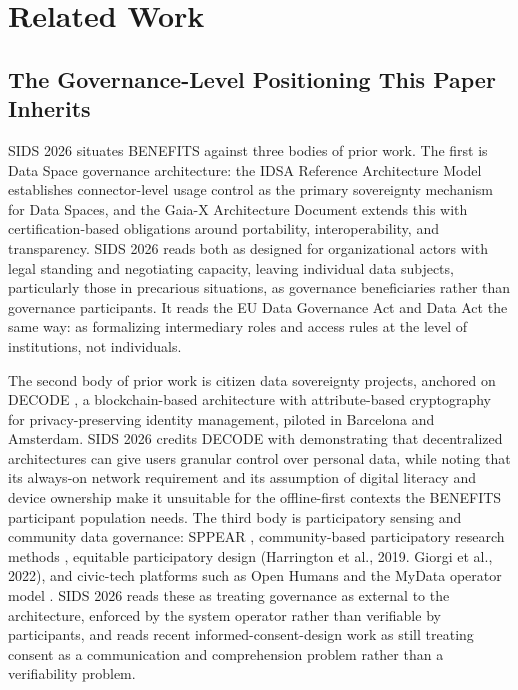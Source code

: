 \section{Related Work}

\subsection{The Governance-Level Positioning This Paper Inherits}

SIDS 2026 \cite{katrakazas2026} situates BENEFITS against three bodies of prior work. The first is Data Space governance architecture: the IDSA Reference Architecture Model \cite{idsram4} establishes connector-level usage control as the primary sovereignty mechanism for Data Spaces, and the Gaia-X Architecture Document \cite{gaiax} extends this with certification-based obligations around portability, interoperability, and transparency. SIDS 2026 \cite{katrakazas2026} reads both as designed for organizational actors with legal standing and negotiating capacity, leaving individual data subjects, particularly those in precarious situations, as governance beneficiaries rather than governance participants. It reads the EU Data Governance Act and Data Act the same way: as formalizing intermediary roles and access rules at the level of institutions, not individuals.

The second body of prior work is citizen data sovereignty projects, anchored on DECODE \cite{decode2019}, a blockchain-based architecture with attribute-based cryptography for privacy-preserving identity management, piloted in Barcelona and Amsterdam. SIDS 2026 \cite{katrakazas2026} credits DECODE with demonstrating that decentralized architectures can give users granular control over personal data, while noting that its always-on network requirement and its assumption of digital literacy and device ownership make it unsuitable for the offline-first contexts the BENEFITS participant population needs. The third body is participatory sensing and community data governance: SPPEAR \cite{gisdakis2014}, community-based participatory research methods \cite{vaughn2020}, equitable participatory design (Harrington et al., 2019. Giorgi et al., 2022), and civic-tech platforms such as Open Humans \cite{openhumans2019} and the MyData operator model \cite{mydata2020}. SIDS 2026 \cite{katrakazas2026} reads these as treating governance as external to the architecture, enforced by the system operator rather than verifiable by participants, and reads recent informed-consent-design work \cite{mcinnis2024} as still treating consent as a communication and comprehension problem rather than a verifiability problem.

